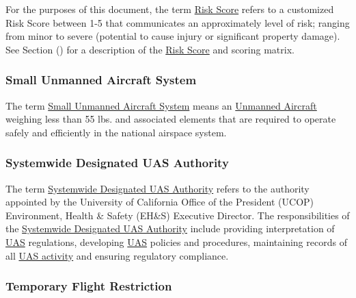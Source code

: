 \documentclass[
]{book}
\begin{document}
For the purposes of this document, the term \protect\hyperlink{riskscore}{Risk Score} refers to a customized Risk Score between 1-5 that communicates an approximately level of risk; ranging from minor to severe (potential to cause injury or significant property damage). See Section () for a description of the \protect\hyperlink{riskscore}{Risk Score} and scoring matrix.



\hypertarget{sUAS}{%
\subsubsection*{Small Unmanned Aircraft System}\label{sUAS}}

The term \protect\hyperlink{sUAS}{Small Unmanned Aircraft System} means an \protect\hyperlink{UA}{Unmanned Aircraft} weighing less than 55 lbs. and associated elements that are required to operate safely and efficiently in the national airspace system.





\hypertarget{SDA}{%
\subsubsection*{Systemwide Designated UAS Authority}\label{SDA}}

The term \protect\hyperlink{SDA}{Systemwide Designated UAS Authority} refers to the authority appointed by the University of California Office of the President (UCOP) Environment, Health \& Safety (EH\&S) Executive Director. The responsibilities of the \protect\hyperlink{SDA}{Systemwide Designated UAS Authority} include providing interpretation of \protect\hyperlink{UAS}{UAS} regulations, developing \protect\hyperlink{UAS}{UAS} policies and procedures, maintaining records of all \protect\hyperlink{UASactivity}{UAS activity} and ensuring regulatory compliance.



\hypertarget{TFR}{%
\subsubsection*{Temporary Flight Restriction}\label{TFR}}
\end{document}
